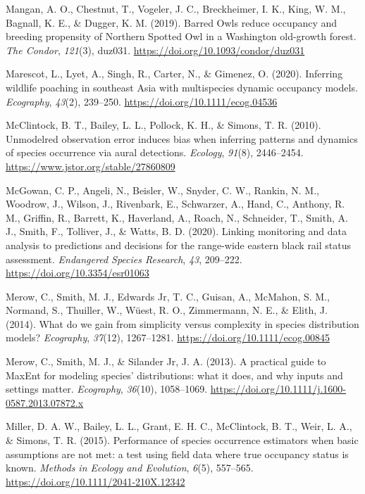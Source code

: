 \documentclass[
]{article}
\newlength{\cslhangindent}
\newenvironment{CSLReferences}[2] %
 {\begin{list}{}{%
  \setlength{\itemindent}{0pt}
  \setlength{\leftmargin}{0pt}
  \setlength{\parsep}{0pt}
  \ifodd #1
   \setlength{\leftmargin}{\cslhangindent}
   \setlength{\itemindent}{-1\cslhangindent}
  \fi
  \setlength{\itemsep}{#2\baselineskip}}}
 {\end{list}}
\begin{document}
\begin{CSLReferences}{1}{0}
Mangan, A. O., Chestnut, T., Vogeler, J. C., Breckheimer, I. K., King,
W. M., Bagnall, K. E., \& Dugger, K. M. (2019). Barred Owls reduce
occupancy and breeding propensity of Northern Spotted Owl in a
Washington old-growth forest. \emph{The Condor}, \emph{121}(3), duz031.
\url{https://doi.org/10.1093/condor/duz031}

Marescot, L., Lyet, A., Singh, R., Carter, N., \& Gimenez, O. (2020).
Inferring wildlife poaching in southeast Asia with multispecies dynamic
occupancy models. \emph{Ecography}, \emph{43}(2), 239--250.
\url{https://doi.org/10.1111/ecog.04536}

McClintock, B. T., Bailey, L. L., Pollock, K. H., \& Simons, T. R.
(2010). Unmodelred observation error induces bias when inferring
patterns and dynamics of species occurrence via aural detections.
\emph{Ecology}, \emph{91}(8), 2446--2454.
\url{https://www.jstor.org/stable/27860809}

McGowan, C. P., Angeli, N., Beisler, W., Snyder, C. W., Rankin, N. M.,
Woodrow, J., Wilson, J., Rivenbark, E., Schwarzer, A., Hand, C.,
Anthony, R. M., Griffin, R., Barrett, K., Haverland, A., Roach, N.,
Schneider, T., Smith, A. J., Smith, F., Tolliver, J., \& Watts, B. D.
(2020). Linking monitoring and data analysis to predictions and
decisions for the range-wide eastern black rail status assessment.
\emph{Endangered Species Research}, \emph{43}, 209--222.
\url{https://doi.org/10.3354/esr01063}

Merow, C., Smith, M. J., Edwards Jr, T. C., Guisan, A., McMahon, S. M.,
Normand, S., Thuiller, W., Wüest, R. O., Zimmermann, N. E., \& Elith, J.
(2014). What do we gain from simplicity versus complexity in species
distribution models? \emph{Ecography}, \emph{37}(12), 1267--1281.
\url{https://doi.org/10.1111/ecog.00845}

Merow, C., Smith, M. J., \& Silander Jr, J. A. (2013). A practical guide
to MaxEnt for modeling species' distributions: what it does, and why
inputs and settings matter. \emph{Ecography}, \emph{36}(10), 1058--1069.
\url{https://doi.org/10.1111/j.1600-0587.2013.07872.x}

Miller, D. A. W., Bailey, L. L., Grant, E. H. C., McClintock, B. T.,
Weir, L. A., \& Simons, T. R. (2015). Performance of species occurrence
estimators when basic assumptions are not met: a test using field data
where true occupancy status is known. \emph{Methods in Ecology and
Evolution}, \emph{6}(5), 557--565.
\url{https://doi.org/10.1111/2041-210X.12342}


\end{CSLReferences}
\end{document}
